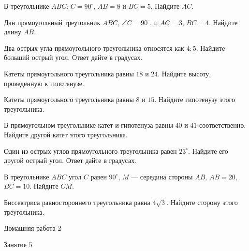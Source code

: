 \begin{class}[number=4]
	\begin{listofex}
		\item В треугольнике \( ABC \): \( C=90^{\circ} \), \( AB=8 \) и \( BC=5 \). Найдите \( AC \).
		\item Дан прямоугольный треугольник \( ABC \), \( \angle C=90^{\circ} \), и \( AC=3 \), \( BC=4 \). Найдите длину \( AB \).
		\item Два острых угла прямоугольного треугольника относятся как \( 4:5 \). Найдите больший острый угол. Ответ дайте в градусах.
		\item Катеты прямоугольного треугольника равны \( 18 \) и \( 24 \). Найдите высоту, проведенную к гипотенузе.
		\item Катеты прямоугольного треугольника равны \( 8 \) и \( 15 \). Найдите гипотенузу этого треугольника.
		\item В прямоугольном треугольнике катет и гипотенуза равны \( 40 \) и \( 41 \) соответственно. Найдите другой катет этого треугольника.
		\item Один из острых углов прямоугольного треугольника равен \( 23^{\circ} \). Найдите его другой острый угол. Ответ дайте в градусах.
		\item В треугольнике \( ABC \) угол \( C \) равен \( 90^{\circ} \), \( M \)  — середина стороны \( AB \), \( AB  =  20 \), \( BC = 10 \). Найдите \( CM \).
		\item Биссектриса равностороннего треугольника равна  \( 4\sqrt{3} \). Найдите сторону этого треугольника.
		
	\end{listofex}
\end{class}

\begin{homework}[number=2]
	\begin{listofex}
		\item Домашняя работа 2
	\end{listofex}
\end{homework}

\begin{class}[number=5]
	\begin{listofex}
		\item Занятие 5
	\end{listofex}
\end{class}

